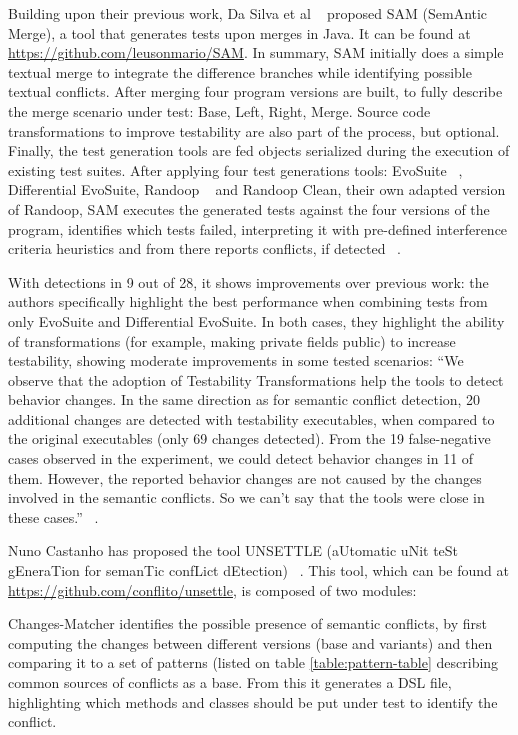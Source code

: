  Building upon their previous work, Da Silva et al ~\citep{kn:leuson2} proposed SAM (SemAntic Merge), a tool that generates tests upon merges in Java. It can be found at \url{https://github.com/leusonmario/SAM}. In summary, SAM initially does a simple textual merge to integrate the difference branches while identifying possible textual conflicts. After merging four program versions are built, to fully describe the merge scenario under test: Base, Left, Right, Merge. Source code transformations to improve testability are also part of the process, but optional. Finally, the test generation tools are fed objects serialized during the execution of existing test suites. After applying four test generations tools: EvoSuite ~\citep{kn:evosuite}, Differential EvoSuite, Randoop ~\citep{kn:randoop} and Randoop Clean, their own adapted version of Randoop, SAM executes the generated tests against the four versions of the program, identifies which tests failed, interpreting it with pre-defined interference criteria heuristics and from there reports conflicts, if detected ~\citep{kn:leuson2}.

With detections in 9 out of 28, it shows improvements over previous work: the authors specifically highlight the best performance when combining tests from only EvoSuite and Differential EvoSuite. In both cases, they highlight the ability of transformations (for example, making private fields public) to increase testability, showing moderate improvements in some tested scenarios: ``We observe that the adoption of Testability Transformations help the tools
to detect behavior changes. In the same direction as for semantic conflict
detection, 20 additional changes are detected with testability executables,
when compared to the original executables (only 69 changes detected). From
the 19 false-negative cases observed in the experiment, we could detect
behavior changes in 11 of them. However, the reported behavior changes are
not caused by the changes involved in the semantic conflicts. So we can’t say
that the tools were close in these cases.''  ~\citep{kn:leuson2}.


Nuno Castanho has proposed the tool UNSETTLE (aUtomatic uNit teSt gEneraTion for semanTic confLict dEtection) ~\citep{kn:nuno}. This tool, which can be found at \url{https://github.com/conflito/unsettle}, is composed of two modules:

Changes-Matcher identifies the possible presence of semantic conflicts, by first computing the changes between different versions (base and variants) and then comparing it to a set of patterns (listed on table \ref{table:pattern-table} describing common sources of conflicts as a base. From this it generates a DSL file, highlighting which methods and classes should be put under test to identify the conflict.

